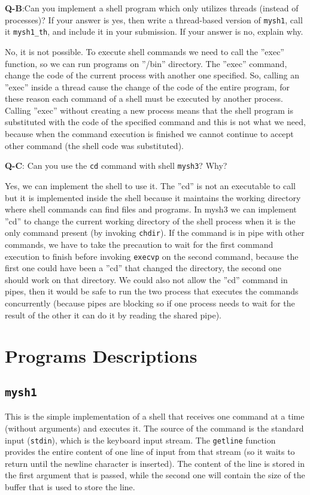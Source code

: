 \textbf{Q-B}:Can you implement a shell program which only utilizes threads (instead of processes)? If your answer is yes, then write a thread-based version of \texttt{mysh1}, call it \texttt{mysh1\_th}, and include it in your submission. If your answer is no, explain why. \newline

No, it is not possible. To execute shell commands we need to call the ''exec'' function, so we can run programs on ''/bin'' directory. The ''exec'' command, change the code of the current process with another one specified. So, calling an ''exec'' inside a thread cause the change of the code of the entire program, for these reason each command of a shell must be executed by another process. Calling ''exec'' without creating a new process means that the shell program is substituted with the code of the specified command and this is not what we need, because when the command execution is finished we cannot continue to accept other command (the shell code was substituted). \newline


\textbf{Q-C}: Can you use the \texttt{cd} command with shell \texttt{mysh3}? Why?\newline

Yes, we can implement the shell to use it. The ''cd'' is not an executable to call but it is implemented inside the shell because it maintains the working directory where shell commands can find files and programs. 
In mysh3 we can implement ''cd'' to change the current working directory of the shell process when it is the only command present (by invoking \texttt{chdir}). If the command is in pipe with other commands, we have to take the precaution to wait for the first command execution to finish before invoking \texttt{execvp} on the second command, because the first one could have been a ''cd'' that changed the directory, the second one should work on that directory. We could also not allow the ''cd'' command in pipes, then it would be safe to run the two process that executes the commands concurrently (because pipes are blocking so if one process needs to wait for the result of the other it can do it by reading the shared pipe).


\section{Programs Descriptions}
\subsection{\texttt{mysh1}}
This is the simple implementation of a shell that receives one command at a time (without arguments) and executes it. The source of the command is the standard input (\texttt{stdin}), which is the keyboard input stream. The \texttt{getline} function provides the entire content of one line of input from that stream (so it waits to return until the newline character is inserted). The content of the line is stored in the first argument that is passed, while the second one will contain the size of the buffer that is used to store the line. \newline

